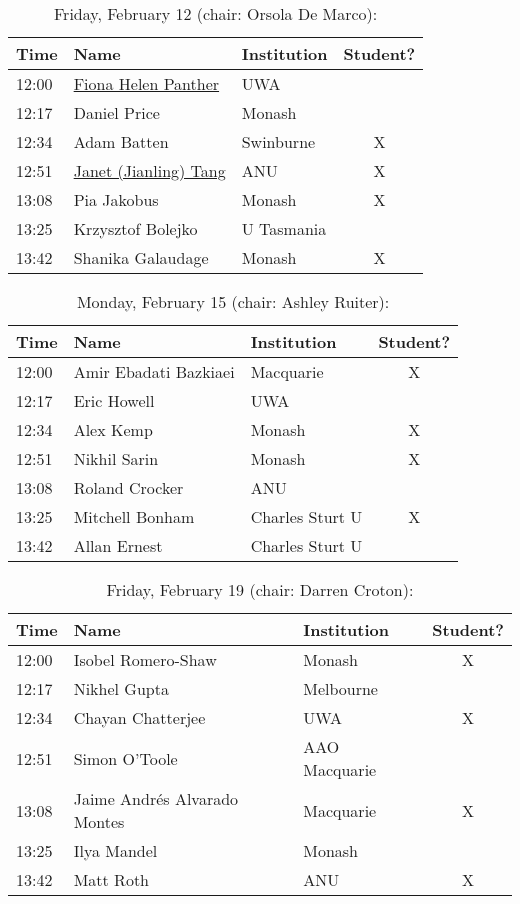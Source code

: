 \documentclass[amsmath,onecolumn]{revtex4-1}
\begin{document}
\begin{table}[!htbp]
	\centering
	\caption{Friday, February 12 (chair: Orsola De Marco):}
\begin{tabular}{| l | l | l | c |}
	\hline
	Time & Name  & Institution & Student? \\ 		
	\hline
	12:00 & \href{https://forms.gle/bZz2KNKeq9Sgx4bN7}{Fiona Helen Panther}  & UWA &  \\
	12:17 & Daniel Price & Monash & \\
	12:34 & Adam	Batten & Swinburne & X \\
	12:51 & \href{https://forms.gle/CB2tycKLop6j5qnX8}{Janet (Jianling) Tang} & ANU & X \\
	13:08 & Pia	Jakobus & Monash & X \\
	13:25 & Krzysztof 	Bolejko & U Tasmania  &	\\
	13:42 & Shanika	Galaudage & Monash & X\\
	\hline
\end{tabular}
\end{table}

\begin{table}[!htbp]
	\centering
	\caption{Monday, February 15 (chair: Ashley Ruiter):}
\begin{tabular}{| l | l | l | c |}
	\hline
	Time & Name  & Institution & Student? \\ 		
	\hline
	12:00 & Amir	Ebadati Bazkiaei & Macquarie & X \\
	12:17 &  Eric	Howell & UWA &\\
	12:34 & Alex	Kemp &  Monash & X\\
	12:51 & Nikhil	Sarin & Monash & X   \\
	13:08 & Roland	Crocker & ANU & \\
	13:25 & Mitchell	Bonham & Charles Sturt U  & X\\
	13:42 & Allan Ernest & Charles Sturt U & \\
	\hline
\end{tabular}
\end{table}

\begin{table}[!htbp]
	\centering
	\caption{Friday, February 19 (chair: Darren Croton):}
\begin{tabular}{| l | l | l | c |}
	\hline
	Time & Name  & Institution & Student? \\ 		
	\hline
	12:00 &  Isobel	Romero-Shaw & Monash & X\\
	12:17 & Nikhel	Gupta  & Melbourne & \\
	12:34 & Chayan	Chatterjee & UWA  & X \\
	12:51 & Simon	O'Toole &	AAO Macquarie  & \\
	13:08 & Jaime Andr\'{e}s	Alvarado Montes &  Macquarie & X\\
	13:25 & Ilya Mandel & Monash & \\
	13:42 & Matt	Roth & ANU & X\\
	\hline
\end{tabular}
\end{table}
\end{document}
